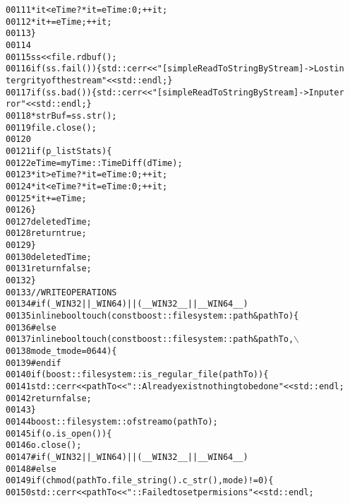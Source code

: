 \begin{footnotesize}
\begin{alltt}
00111                 *it < eTime ? *it = eTime : 0;      ++it;
00112                 *it += eTime;                       ++it;
00113             \}
00114 
00115             ss << file.rdbuf();
00116                 \textcolor{keywordflow}{if} (ss.fail())\{ std::cerr<<\textcolor{stringliteral}{"[simpleReadToStringByStream]->Lost in
      tergrity of the stream"}<<std::endl; \}
00117                 \textcolor{keywordflow}{if} (ss.bad())\{ std::cerr<<\textcolor{stringliteral}{"[simpleReadToStringByStream]->Input er
      ror"}<<std::endl; \}
00118             *strBuf = ss.str();
00119             file.close();
00120 
00121             \textcolor{keywordflow}{if} (p\_listStats)\{
00122                 eTime = myTime::TimeDiff( dTime );
00123                 *it > eTime ? *it = eTime : 0;      ++it;
00124                 *it < eTime ? *it = eTime : 0;      ++it;
00125                 *it += eTime;
00126             \}
00127             \textcolor{keyword}{delete} dTime;
00128             \textcolor{keywordflow}{return} \textcolor{keyword}{true};
00129         \}
00130         \textcolor{keyword}{delete} dTime;
00131         \textcolor{keywordflow}{return} \textcolor{keyword}{false};
00132     \}
00133     \textcolor{comment}{//WRITE OPERATIONS}
00134 \textcolor{preprocessor}{#if ( \_WIN32 || \_WIN64 ) || ( \_\_WIN32\_\_ || \_\_WIN64\_\_ )}
00135 \textcolor{preprocessor}{}    \textcolor{keyword}{inline} \textcolor{keywordtype}{bool} touch(\textcolor{keyword}{const} boost::filesystem::path &pathTo)\{
00136 \textcolor{preprocessor}{#else}
00137 \textcolor{preprocessor}{}    \textcolor{keyword}{inline} \textcolor{keywordtype}{bool} touch(\textcolor{keyword}{const} boost::filesystem::path &pathTo,\(\backslash\)
00138                       mode\_t mode =0644)\{
00139 \textcolor{preprocessor}{#endif}
00140 \textcolor{preprocessor}{}        \textcolor{keywordflow}{if} ( boost::filesystem::is\_regular\_file(pathTo) )\{
00141             std::cerr<<pathTo<<\textcolor{stringliteral}{"::Already exist nothing to be done"}<<std::endl;
00142             \textcolor{keywordflow}{return} \textcolor{keyword}{false};
00143         \}
00144         boost::filesystem::ofstream o (pathTo);
00145         \textcolor{keywordflow}{if}(o.is\_open())\{
00146             o.close();
00147 \textcolor{preprocessor}{        #if ( \_WIN32 || \_WIN64 ) || ( \_\_WIN32\_\_ || \_\_WIN64\_\_ )}
00148 \textcolor{preprocessor}{}\textcolor{preprocessor}{        #else}
00149 \textcolor{preprocessor}{}            \textcolor{keywordflow}{if} (chmod(pathTo.file\_string().c\_str(),mode)!= 0)\{
00150                     std::cerr<<pathTo<<\textcolor{stringliteral}{"::Failed to set permisions"}<<std::endl;

\end{alltt}
\end{footnotesize}
